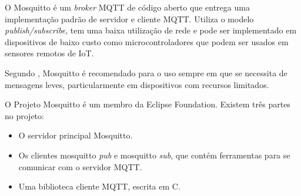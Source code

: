 O Mosquitto é um \textit{broker} MQTT de código aberto \cite{Kodali2017} que entrega uma implementação padrão de servidor e cliente MQTT. Utiliza o modelo \textit{publish/subscribe}, tem uma baixa utilização de rede e pode ser implementado em dispositivos de baixo custo como microcontroladores que podem ser usados em sensores remotos de IoT. \cite{Light}

Segundo \cite{Light}, Mosquitto é recomendado para o uso sempre em que se necessita de mensagens leves, particularmente em dispositivos com recursos limitados.

O Projeto Mosquitto é um membro da Eclipse Foundation. Existem três partes no projeto:

\begin{itemize}
	\item O servidor principal Mosquitto.
	\item Os clientes mosquitto \textit{pub} e mosquitto \textit{sub}, que contém ferramentas para se comunicar com o servidor MQTT.
	\item Uma biblioteca cliente MQTT, escrita em C.
\end{itemize}
